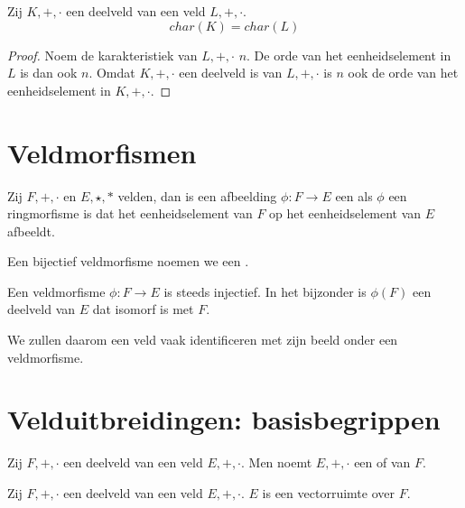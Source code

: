 \documentclass[main.tex]{subfiles}
\begin{document}
\begin{st}
  Zij $K,+,\cdot$ een deelveld van een veld $L,+,\cdot$.
  \[ char(K) = char(L) \]

  \begin{proof}
    Noem de karakteristiek van $L,+,\cdot$ $n$.
    De orde van het eenheidselement in $L$ is dan ook $n$.
    Omdat $K,+,\cdot$ een deelveld is van $L,+,\cdot$ is $n$ ook de orde van het eenheidselement in $K,+,\cdot$.
  \end{proof}
\end{st}

\section{Veldmorfismen}
\label{sec:veldmorfismen}

\begin{de}
  Zij $F,+,\cdot$ en $E,\star,*$ velden, dan is een afbeelding $\phi: F \rightarrow E$ een  als $\phi$ een ringmorfisme is dat het eenheidselement van $F$ op het eenheidselement van $E$ afbeeldt.
\end{de}

\begin{de}
  Een bijectief veldmorfisme noemen we een .
\end{de}

\begin{st}
  \label{st:veldmorfisme-is-injectief}
  Een veldmorfisme $\phi: F \rightarrow E$ is steeds injectief.
  In het bijzonder is $\phi(F)$ een deelveld van $E$ dat isomorf is met $F$.
\end{st}

\begin{opm}
  We zullen daarom een veld vaak identificeren met zijn beeld onder een veldmorfisme.
\end{opm}

\section{Velduitbreidingen: basisbegrippen}
\label{sec:veld-basisb}

\begin{de}
  Zij $F,+,\cdot$ een deelveld van een veld $E,+,\cdot$.
  Men noemt $E,+,\cdot$ een  of  van $F$.
\end{de}

\begin{st}
  Zij $F,+,\cdot$ een deelveld van een veld $E,+,\cdot$.
  $E$ is een vectorruimte over $F$.
  
\end{st}
\end{document}
